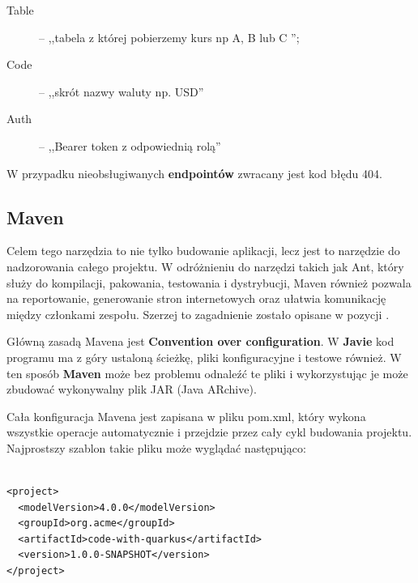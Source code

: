 \documentclass{iiuwb}
\begin{document}
\begin{description}
  \item[Table]  -- ,,tabela z której pobierzemy kurs np A, B lub C '';
  \item[Code] -- ,,skrót nazwy waluty np. USD''
  \item[Auth] -- ,,Bearer token z odpowiednią rolą''
\end{description}

W przypadku nieobsługiwanych \textbf{endpointów} zwracany jest kod błędu 404. \newline

\subsection{Maven}
\label{sec:Maven}

Celem tego narzędzia to nie tylko budowanie aplikacji, lecz jest to narzędzie do nadzorowania całego projektu. W odróżnieniu do narzędzi takich jak Ant, który służy do kompilacji, pakowania, testowania i dystrybucji, Maven również pozwala na reportowanie, generowanie stron internetowych oraz ułatwia komunikację między członkami zespołu. Szerzej to zagadnienie zostało opisane w pozycji \cite{Maven}.\newline

Główną zasadą Mavena jest \textbf{Convention over configuration}. W \textbf{Javie} kod programu ma z góry ustaloną ścieżkę, pliki konfiguracyjne i testowe również. W ten sposób \textbf{Maven} może bez problemu odnaleźć te pliki i wykorzystując je może zbudować wykonywalny plik JAR (Java ARchive).

Cała konfiguracja Mavena jest zapisana w pliku pom.xml, który wykona wszystkie operacje automatycznie i przejdzie przez cały cykl budowania projektu. Najprostszy szablon takie pliku może wyglądać następująco: 

\begin{lstlisting}[breaklines=true]

<project>
  <modelVersion>4.0.0</modelVersion>
  <groupId>org.acme</groupId>
  <artifactId>code-with-quarkus</artifactId>
  <version>1.0.0-SNAPSHOT</version>
</project>

\end{lstlisting}
\end{document}
